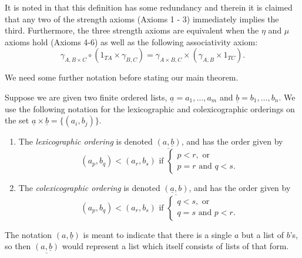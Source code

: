 \begin{rem}
    It is noted in \cite[Proposition 1]{HP} that this definition has some redundancy and therein it is claimed that any two of the strength axioms (Axioms 1 - 3) immediately implies the third. Furthermore, the three strength axioms are equivalent when the $\eta$ and $\mu$ axioms hold (Axioms 4-6) as well as the following associativity axiom:
        \[
            \gamma_{A,B \times C} \circ (1_{TA} \times \gamma_{B,C}) = \gamma_{A \times B,C} \times (\gamma_{A,B} \times 1_{TC}).
        \]
\end{rem}

We need some further notation before stating our main theorem. 

\begin{nota}\label{nota:double-underlines}
Suppose we are given two finite ordered lists, $\underline{a} = a_{1}, \ldots , a_{m}$ and $\underline{b} = b_{1}, \ldots, b_{n}$. We use the following notation for the lexicographic and colexicographic orderings on the set $\underline{a} \times \underline{b} = \{ (a_{i}, b_{j})\}$. 
\begin{enumerate}
\item The \emph{lexicographic ordering} is denoted $\underline{(a, \underline{b})}$, and has the order given by
  \[
    (a_{p}, b_{q}) < (a_{r}, b_{s}) \textrm{ if } \left\{ \begin{array}{l} p < r, \textrm{ or } \\ p=r \textrm{ and } q < s. \end{array} \right.
  \]
\item The \emph{colexicographic ordering} is denoted $\underline{(\underline{a}, b)}$, and has the order given by
\[
    (a_{p}, b_{q}) < (a_{r}, b_{s}) \textrm{ if } \left\{ \begin{array}{l} q < s, \textrm{ or } \\ q=s \textrm{ and } p < r. \end{array} \right.
  \]
\end{enumerate}
\end{nota}

\begin{rem}
The notation $(a, \underline{b})$ is meant to indicate that there is a single $a$ but a list of $b$'s, so then $\underline{(a, \underline{b})}$ would represent a list which itself consists of lists of that form. 
\end{rem}

